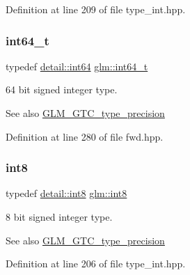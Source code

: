 Definition at line 209 of file type\+\_\+int.\+hpp.

\mbox{\label{group__gtc__type__precision_ga6abb23fbf4e39c50ec5341160b5da5ab}} 
\subsubsection{\texorpdfstring{int64\_t}{int64\_t}}
{\footnotesize\ttfamily typedef \mbox{\hyperlink{namespaceglm_1_1detail_a5b1c3227ec636c24a0676746381adfc8}{detail\+::int64}} \mbox{\hyperlink{group__gtc__type__precision_ga6abb23fbf4e39c50ec5341160b5da5ab}{glm\+::int64\+\_\+t}}}

64 bit signed integer type. \begin{DoxySeeAlso}{See also}
\mbox{\hyperlink{group__gtc__type__precision}{G\+L\+M\+\_\+\+G\+T\+C\+\_\+type\+\_\+precision}} 
\end{DoxySeeAlso}


Definition at line 280 of file fwd.\+hpp.

\mbox{\label{group__gtc__type__precision_ga96254f9c1c4506fc8eb5cf3301ce8565}} 
\subsubsection{\texorpdfstring{int8}{int8}}
{\footnotesize\ttfamily typedef \mbox{\hyperlink{namespaceglm_1_1detail_a04b526a8d7a9b455602a0afa78c531e0}{detail\+::int8}} \mbox{\hyperlink{group__gtc__type__precision_ga96254f9c1c4506fc8eb5cf3301ce8565}{glm\+::int8}}}

8 bit signed integer type. \begin{DoxySeeAlso}{See also}
\mbox{\hyperlink{group__gtc__type__precision}{G\+L\+M\+\_\+\+G\+T\+C\+\_\+type\+\_\+precision}} 
\end{DoxySeeAlso}


Definition at line 206 of file type\+\_\+int.\+hpp.

\mbox{\label{group__gtc__type__precision_ga673898d450b2a91186f3c4f40c5f8633}} 
